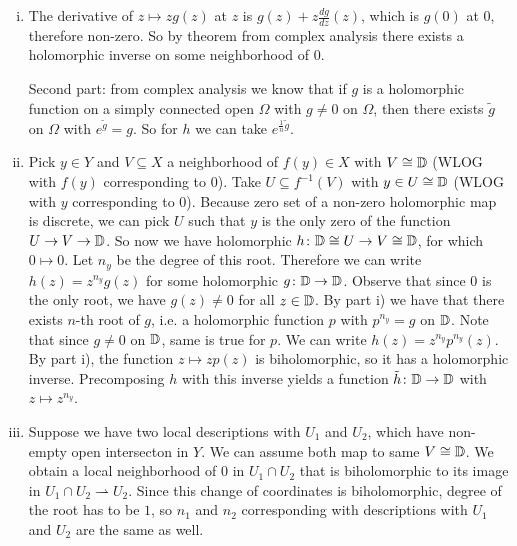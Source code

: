 \begin{exercise}{3}
    \begin{enumerate}[i)]
        \item{
                The derivative of $z \mapsto z g(z)$ at $z$ is $g(z) + z
                \frac{dg}{dz}(z)$, which is $g(0)$ at $0$, therefore non-zero.
                So by theorem from complex analysis there exists a holomorphic
                inverse on some neighborhood of $0$.

                Second part: from complex analysis we know that if $g$ is a
                holomorphic function on a simply connected open $\Omega$ with $g \not= 0$
                on $\Omega$, then there exists $\tilde{g}$ on $\Omega$ with
                $e^{\tilde{g}} = g$.
                So for $h$ we can take $e^{\frac{1}{n} \tilde{g}}$.
            }
        \item{
                Pick $y \in Y$ and $V \subseteq X$ a neighborhood of $f(y) \in
                X$ with $V \cong \mathbb{D}$ (WLOG with $f(y)$ corresponding to $0$).
                Take $U \subseteq f^{-1}(V)$ with $y \in U \cong \mathbb{D}$ (WLOG with
                $y$ corresponding to $0$).
                Because zero set of a non-zero holomorphic map is discrete, we
                can pick $U$ such that $y$ is the only zero of the function $U
                \to V \to \mathbb{D}$.
                So now we have holomorphic $h \colon \mathbb{D} \cong U \to V \cong \mathbb{D}$, for
                which $0 \mapsto 0$. Let $n_y$ be the degree of this root. 
                Therefore we can write $h(z) = z^{n_y} g(z)$ for some
                holomorphic $g \colon \mathbb{D} \to \mathbb{D}$. Observe that since $0$ is the
                only root, we have $g(z) \not= 0$ for all $z \in \mathbb{D}$.
                By part i) we have that there exists $n$-th root of $g$, i.e. a
                holomorphic function $p$ with $p^{n_y} = g$ on $\mathbb{D}$.
                Note that since $g \not= 0$ on $\mathbb{D}$, same is true for $p$.
                We can write $h(z) = z^{n_y} p^{n_y}(z)$.
                By part i), the function $z \mapsto z p(z)$ is biholomorphic, so
                it has a holomorphic inverse. Precomposing $h$ with this inverse
                yields a function $\tilde{h} \colon \mathbb{D} \to \mathbb{D}$ with $z \mapsto z^{n_y}$.
            }
        \item{
                Suppose we have two local descriptions with $U_1$ and $U_2$,
                which have non-empty open intersecton in $Y$. We can assume both
                map to same $V \cong \mathbb{D}$. We obtain a local neighborhood of $0$
                in $U_1 \cap U_2$ that is biholomorphic to its image in $U_1
                \cap U_2 \rightharpoonup U_2$. Since this change of coordinates
                is biholomorphic, degree of the root has to be $1$, so $n_1$ and
                $n_2$ corresponding with descriptions with $U_1$ and $U_2$ are
                the same as well.

}
\end{enumerate}
\end{exercise}
